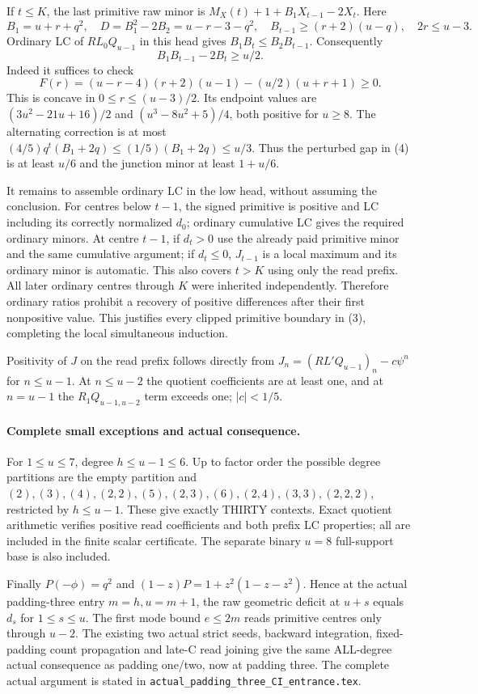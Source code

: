 If $t\le K$, the last primitive raw minor is
$M_X(t)+1+B_1X_{t-1}-2X_t$.
Here
\[
 B_1=u+r+q^2,\quad D=B_1^2-2B_2=u-r-3-q^2,
 \quad B_{t-1}\ge(r+2)(u-q),\quad 2r\le u-3.
\]
Ordinary LC of $RL_0Q_{u-1}$ in this head gives
$B_1B_t\le B_2B_{t-1}$. Consequently
\[
 B_1B_{t-1}-2B_t\ge u/2.                            \tag{4}
\]
Indeed it suffices to check
\[
 F(r)=(u-r-4)(r+2)(u-1)-(u/2)(u+r+1)\ge0.
\]
This is concave in $0\le r\le(u-3)/2$. Its endpoint values are
$(3u^2-21u+16)/2$ and $(u^3-8u^2+5)/4$, both positive for $u\ge8$.
The alternating correction is at most
$(4/5)q^t(B_1+2q)\le(1/5)(B_1+2q)\le u/3$.
Thus the perturbed gap in (4) is at least $u/6$ and the junction
minor at least $1+u/6$.

It remains to assemble ordinary LC in the low head, without assuming
the conclusion. For centres below $t-1$, the signed primitive is
positive and LC including its correctly normalized $d_0$; ordinary
cumulative LC gives the required ordinary minors. At centre $t-1$,
if $d_t>0$ use the already paid primitive minor and the same cumulative
argument; if $d_t\le0$, $J_{t-1}$ is a local maximum and its ordinary
minor is automatic. This also covers $t>K$ using only the read prefix.
All later ordinary centres through $K$ were inherited independently.
Therefore ordinary ratios prohibit a recovery of positive differences
after their first nonpositive value. This justifies every clipped
primitive boundary in (3), completing the local simultaneous induction.

Positivity of $J$ on the read prefix follows directly from
$J_n=(RL'Q_{u-1})_n-c\psi^n$ for $n\le u-1$.
At $n\le u-2$ the quotient coefficients are at least one, and at
$n=u-1$ the $R_1Q_{u-1,u-2}$ term exceeds one; $|c|<1/5$.

\paragraph{Complete small exceptions and actual consequence.}
For $1\le u\le7$, degree $h\le u-1\le6$. Up to factor order the
possible degree partitions are the empty partition and
$(2),(3),(4),(2,2),(5),(2,3),(6),(2,4),(3,3),(2,2,2)$,
restricted by $h\le u-1$. These give exactly THIRTY contexts.
Exact quotient arithmetic verifies positive read coefficients and both
prefix LC properties; all are included in the finite scalar certificate.
The separate binary $u=8$ full-support base is also included.

Finally $P(-\phi)=q^2$ and
$(1-z)P=1+z^2(1-z-z^2)$. Hence at the actual padding-three entry
$m=h,u=m+1$, the raw geometric deficit at $u+s$ equals $d_s$ for
$1\le s\le u$. The first mode bound $e\le2m$ reads primitive
centres only through $u-2$. The existing two actual strict seeds,
backward integration, fixed-padding count propagation and late-C
read joining give the same ALL-degree actual consequence as padding
one/two, now at padding three. The complete actual argument is stated
in \texttt{actual\_padding\_three\_CI\_entrance.tex}.

